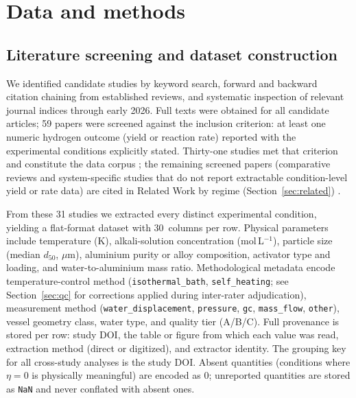 \section{Data and methods}

\subsection{Literature screening and dataset construction}

We identified candidate studies by keyword search, forward and backward citation
chaining from established reviews, and systematic inspection of relevant journal indices
through early 2026. Full texts were obtained for all candidate articles; 59 papers were
screened against the inclusion criterion: at least one numeric hydrogen outcome (yield or
reaction rate) reported with the experimental conditions explicitly stated. Thirty-one
studies met that criterion and constitute the data corpus
\cite{wen2018,prabu2021,wanghq2017,yavor2013,rin2021,trowell2022,deng2010,porciuncula2012,zhang2024,liuyh2017,qiao2019,meng2022,xiao2018,guan2019,preez2018,chen2020,xiao2020,davies2022mat,ilyukhina2012,dudoladov2016,fischman2020,lu2017,jayaraman2015,gupta2025,ho2016,knoks2025,mezulis2023,martinezv2026,buryakov2023met,urbonav2024,fadhilah2023};
the remaining screened papers (comparative reviews and system-specific studies that do
not report extractable condition-level yield or rate data) are cited in Related Work by
regime (Section~\ref{sec:related})
\cite{razavi2016,yang2018,shmelev2016,noland2020,wangxy2021,elitzur2014,tan2016,godart2019,razavi2013,preez2019,david2012,slocum2020}.

From these 31 studies we extracted every distinct experimental condition, yielding a
flat-format dataset with 30~columns per row. Physical parameters include temperature (K),
alkali-solution concentration (mol\,L$^{-1}$), particle size (median $d_{50}$, $\mu$m),
aluminium purity or alloy composition, activator type and loading, and
water-to-aluminium mass ratio. Methodological metadata encode temperature-control method
(\texttt{isothermal\_bath}, \texttt{self\_heating}; see Section~\ref{sec:qc} for
corrections applied during inter-rater adjudication), measurement
method (\texttt{water\_displacement}, \texttt{pressure}, \texttt{gc}, \texttt{mass\_flow},
\texttt{other}), vessel geometry
class, water type, and quality tier (A/B/C). Full provenance is stored per row: study
DOI, the table or figure from which each value was read, extraction method (direct or
digitized), and extractor identity. The grouping key for all cross-study analyses is the
study DOI. Absent quantities (conditions where $\eta\!=\!0$ is physically meaningful) are
encoded as $0$; unreported quantities are stored as \texttt{NaN} and never conflated
with absent ones.

